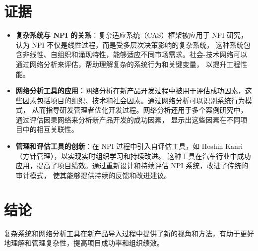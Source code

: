 \section{证据}

\begin{itemize}
    \item \textbf{复杂系统与 NPI 的关系}：复杂适应系统（CAS）框架被应用于 NPI 研究，认为 NPI 不仅是线性过程，而是受多层次决策影响的复杂系统，
    这种系统包含非线性、自组织和涌现特性，能够适应不同市场需求\citep{mccarthy2006}。社会-技术网络可以通过网络分析来评估，帮助理解复杂的系统行为和关键变量，
    以提升工程性能\citep{pflaum2017}。

    \item \textbf{网络分析工具的应用}：网络分析在新产品开发过程中被用于评估成功因素，这些因素包括项目的组织、技术和社会因素。通过网络分析可以识别系统行为模式，
    从而指导研发管理者优化开发过程\citep{kallenborn2014}。网络分析还用于多个案例研究中，通过评估因果网络来分析新产品开发的成功因素，
    显示出这些因素在不同项目中的相互关联性\citep{pflaum2017}。

    \item \textbf{管理和评估工具的创新}：在 NPI 过程中引入自评估工具，如 Hoshin Kanri（方针管理），以实现实时组织学习和持续改进。
    这种工具在汽车行业中成功应用，提高了项目绩效\citep{tennant2003}。通过重新设计和持续评估 NPI 系统，改进了传统的审计模式，
    使其能够提供持续的反馈和改进建议\citep{gardiner1996}。
\end{itemize}

\section{结论}

复杂系统和网络分析工具在新产品导入过程中提供了新的视角和方法，有助于更好地理解和管理复杂性，提高项目成功率和组织绩效。
